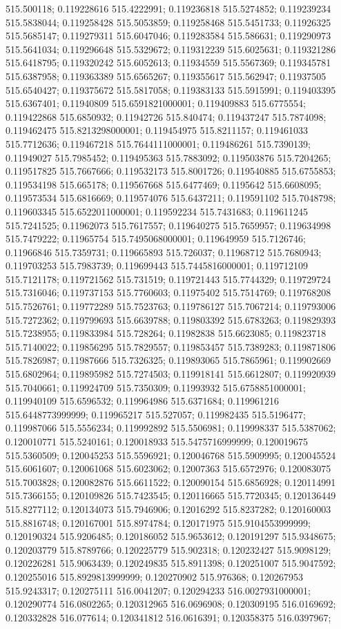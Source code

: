 515.500118; 0.119228616 515.4222991; 0.119236818 515.5274852; 0.119239234 515.5838044; 0.119258428 515.5053859; 0.119258468 515.5451733; 0.11926325 515.5685147; 0.119279311 515.6047046; 0.119283584 515.586631; 0.119290973 515.5641034; 0.119296648 515.5329672; 0.119312239 515.6025631; 0.119321286 515.6418795; 0.119320242 515.6052613; 0.11934559 515.5567369; 0.119345781 515.6387958; 0.119363389 515.6565267; 0.119355617 515.562947; 0.11937505 515.6540427; 0.119375672 515.5817058; 0.119383133 515.5915991; 0.119403395 515.6367401; 0.11940809 515.6591821000001; 0.119409883 515.6775554; 0.119422868 515.6850932; 0.11942726 515.840474; 0.119437247 515.7874098; 0.119462475 515.8213298000001; 0.119454975 515.8211157; 0.119461033 515.7712636; 0.119467218 515.7644111000001; 0.119486261 515.7390139; 0.11949027 515.7985452; 0.119495363 515.7883092; 0.119503876 515.7204265; 0.119517825 515.7667666; 0.119532173 515.8001726; 0.119540885 515.6755853; 0.119534198 515.665178; 0.119567668 515.6477469; 0.1195642 515.6608095; 0.119573534 515.6816669; 0.119574076 515.6437211; 0.119591102 515.7048798; 0.119603345 515.6522011000001; 0.119592234 515.7431683; 0.119611245 515.7241525; 0.11962073 515.7617557; 0.119640275 515.7659957; 0.119634998 515.7479222; 0.11965754 515.7495068000001; 0.119649959 515.7126746; 0.11966846 515.7359731; 0.119665893 515.726037; 0.11968712 515.7680943; 0.119703253 515.7983739; 0.119699443 515.7445816000001; 0.119712109 515.7121178; 0.119721562 515.731519; 0.119721443 515.7744329; 0.119729724 515.7316046; 0.119737153 515.7760603; 0.11975402 515.7514769; 0.119768208 515.7526761; 0.119772289 515.7523763; 0.119786127 515.7067214; 0.119793006 515.7272362; 0.119799693 515.6639788; 0.119803392 515.6783263; 0.119829393 515.7238955; 0.119833984 515.728264; 0.11982838 515.6623085; 0.119823718 515.7140022; 0.119856295 515.7829557; 0.119853457 515.7389283; 0.119871806 515.7826987; 0.11987666 515.7326325; 0.119893065 515.7865961; 0.119902669 515.6802964; 0.119895982 515.7274503; 0.119918141 515.6612807; 0.119920939 515.7040661; 0.119924709 515.7350309; 0.11993932 515.6758851000001; 0.119940109 515.6596532; 0.119964986 515.6371684; 0.119961216 515.6448773999999; 0.119965217 515.527057; 0.119982435 515.5196477; 0.119987066 515.5556234; 0.119992892 515.5506981; 0.119998337 515.5387062; 0.120010771 515.5240161; 0.120018933 515.5475716999999; 0.120019675 515.5360509; 0.120045253 515.5596921; 0.120046768 515.5909995; 0.120045524 515.6061607; 0.120061068 515.6023062; 0.12007363 515.6572976; 0.120083075 515.7003828; 0.120082876 515.6611522; 0.120090154 515.6856928; 0.120114991 515.7366155; 0.120109826 515.7423545; 0.120116665 515.7720345; 0.120136449 515.8277112; 0.120134073 515.7946906; 0.12016292 515.8237282; 0.120160003 515.8816748; 0.120167001 515.8974784; 0.120171975 515.9104553999999; 0.120190324 515.9206485; 0.120186052 515.9653612; 0.120191297 515.9348675; 0.120203779 515.8789766; 0.120225779 515.902318; 0.120232427 515.9098129; 0.120226281 515.9063439; 0.120249835 515.8911398; 0.120251007 515.9047592; 0.120255016 515.8929813999999; 0.120270902 515.976368; 0.120267953 515.9243317; 0.120275111 516.0041207; 0.120294233 516.0027931000001; 0.120290774 516.0802265; 0.120312965 516.0696908; 0.120309195 516.0169692; 0.120332828 516.077614; 0.120341812 516.0616391; 0.120358375 516.0397967; 